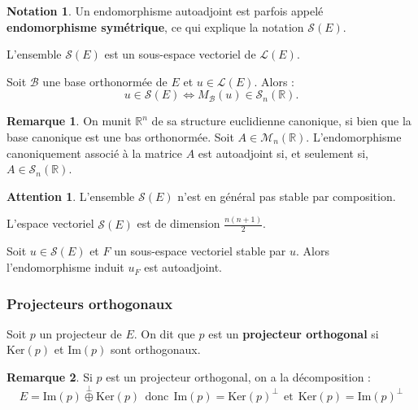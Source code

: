 \documentclass[french]{article}
\newcommand{\R}{\mathbb{R}}
\renewcommand{\ker}{\text{Ker}}
\theoremstyle{plain}
\theoremstyle{definition}
\newtheorem*{rmq}{Remarque}
\newtheorem*{notation}{Notation}
\newtheorem*{attention}{Attention}
\theoremstyle{remark}
\begin{document}
\begin{notation}
	Un endomorphisme autoadjoint est parfois appelé \textbf{endomorphisme symétrique}, ce qui explique la notation $\mathcal{S}(E)$.
\end{notation}

\begin{prop}
	L'ensemble $\mathcal{S}(E)$ est un sous-espace vectoriel de $\mathcal{L}(E)$.
\end{prop}

\begin{prop}
	Soit $\mathcal{B}$ une base orthonormée de $E$ et $u\in\mathcal{L}(E)$. Alors : $$u\in \mathcal{S}(E)\iff M_\mathcal{B}(u)\in\mathcal{S}_n(\R).$$
\end{prop}

\begin{rmq}
	On munit $\R^n$ de sa structure euclidienne canonique, si bien que la base canonique est une bas orthonormée. Soit $A\in\mathcal{M}_n(\R)$. L'endomorphisme canoniquement associé à la matrice $A$ est autoadjoint si, et seulement si, $A\in\mathcal{S}_n(\R)$.
\end{rmq}

\begin{attention}
	L'ensemble $\mathcal{S}(E)$ n'est en général pas stable par composition.
\end{attention}

\begin{cor}
	L'espace vectoriel $\mathcal{S}(E)$ est de dimension $\displaystyle\frac{n(n+1)}{2}$.
\end{cor}

\begin{lem}
	Soit $u\in\mathcal{S}(E)$ et $F$ un sous-espace vectoriel stable par $u$. Alors l'endomorphisme induit $u_F$ est autoadjoint.
\end{lem}

\subsubsection*{Projecteurs orthogonaux}

\begin{dfn}
	Soit $p$ un projecteur de $E$. On dit que $p$ est un \textbf{projecteur orthogonal} si $\ker(p)$ et $\text{Im}(p)$ sont orthogonaux.
\end{dfn}

\begin{rmq}
	Si $p$ est un projecteur orthogonal, on a la décomposition : $$E=\text{Im}(p)\overset{\bot}{\oplus}\ker(p)\ \ \text{donc} \ \ \text{Im}(p)=\ker(p)^\bot\ \ \text{et}\ \ \ker(p)=\text{Im}(p)^\bot$$
\end{rmq}
\end{document}
